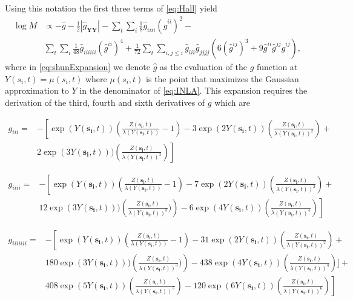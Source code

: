 \documentclass[11pt]{isuthesis}
\begin{document}
	Using this notation the first three terms of \eqref{eq:Hall} yield
	 \begin{align}
	 \log M & \propto -\hat{g}-\frac{1}{2}|\hat{g}_{\boldsymbol{YY}}|-\sum_{t}\sum_{i}\frac{1}{8}\hat{g}_{iiii}(\hat{g}^{ii})^2- \nonumber\\
	 &\sum_{t}\sum_{i}\frac{1}{48}\hat{g}_{iiiiii}(\hat{g}^{ii})^4 +
	 \frac{1}{72}\sum_{t}\sum_{i,j\leq i}\hat{g}_{iii}\hat{g}_{jjjj}\left(6 \left(\hat{g}^{ij}\right)^3+9 \hat{g}^{ii}\hat{g}^{jj}\hat{g}^{ij}\right) \label{eq:shunExpansion},
	 \end{align}
	 where in \eqref{eq:shunExpansion} we denote $\hat{g}$ as the evaluation of the $g$ function at $Y(s_i,t)=\mu(s_i,t)$ where $\mu(s_i,t)$ is the point that maximizes the Gaussian approximation to $Y$ in the denominator of \eqref{eq:INLA}. This expansion requires the derivation of the third, fourth and sixth derivatives of $g$ which are
	
	\begin{align}
	g_{iii}=  &-\left[\exp(Y(\boldsymbol{s_i},t))\left(\frac{Z(\boldsymbol{s_i},t)}{\lambda(Y(\boldsymbol{s_i},t))}-1\right)-3\exp(2 Y(\boldsymbol{s_i},t))\left(\frac{ Z(\boldsymbol{s_i},t)}{\lambda(Y(\boldsymbol{s_i},t))^2}\right)+\right.\nonumber\\
	& \left. 2\exp(3Y(\boldsymbol{s_i},t)))\left(\frac{ Z(\boldsymbol{s_i},t)}{\lambda(Y(\boldsymbol{s_i},t))^3}\right)\right] \label{eq:thirds}
	\end{align}
	
	\begin{align}
	g_{iiii}=  &-\left[\exp(Y(\boldsymbol{s_i},t))\left(\frac{ Z(\boldsymbol{s_i},t)}{\lambda(Y(\boldsymbol{s_i},t))}-1\right)-7\exp(2 Y(\boldsymbol{s_i},t))\left(\frac{Z(\boldsymbol{s_i},t)}{\lambda(Y(\boldsymbol{s_i},t))^2}\right)+\right.\nonumber\\
	& \left. 12\exp(3Y(\boldsymbol{s_i},t)))\left(\frac{ Z(\boldsymbol{s_i},t)}{\lambda(Y(\boldsymbol{s_i},t))^3})\right)-6\exp(4Y(\boldsymbol{s_i},t))\left(\frac{ Z(\boldsymbol{s_i},t)}{\lambda(Y(\boldsymbol{s_i},t))^4}\right)\right] \label{eq:fourths}
	\end{align}
	
	\begin{align}
	g_{iiiiiii}=  &-\left[\exp(Y(\boldsymbol{s_i},t))\left(\frac{Z(\boldsymbol{s_i},t)}{\lambda(Y(\boldsymbol{s_i},t))}-1\right)-31\exp(2 Y(\boldsymbol{s_i},t))\left(\frac{Z(\boldsymbol{s_i},t)}{\lambda(Y(\boldsymbol{s_i},t))^2}\right)+\right. \nonumber \\
	& 180\exp(3Y(\boldsymbol{s_i},t)))\left(\frac{ Z(\boldsymbol{s_i},t)}{\lambda(Y(\boldsymbol{s_i},t))^3})\right)-438\exp(4Y(\boldsymbol{s_i},t))\left(\frac{ Z(\boldsymbol{s_i},t)}{\lambda(Y(\boldsymbol{s_i},t))^4}\right)]+\nonumber\\
	& \left. 408\exp(5Y(\boldsymbol{s_i},t))\left(\frac{ Z(\boldsymbol{s_i},t)}{\lambda(Y(\boldsymbol{s_i},t))^5}\right)-120\exp(6Y(\boldsymbol{s_i},t))\left(\frac{ Z(\boldsymbol{s_i},t)}{\lambda(Y(\boldsymbol{s_i},t))^6}\right)\right] \label{eq:sixths}
	\end{align}
	
\end{document}
